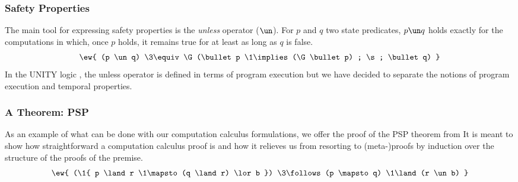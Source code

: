 \subsubsection{Safety Properties}
\label{sec:safety-properties}
The main tool for expressing safety properties is the \emph{unless} operator ($\un$).  For $p$ and $q$ two state predicates, $p \un q$ holds exactly for the computations in which, once $p$ holds, it remains true for at least as long as $q$ is false.
%
\begin{equation}
	\ew{ (p \un q) \3\equiv \G (\bullet p \1\implies (\G \bullet p) ; \s ; \bullet q) }
\end{equation}
%
In the UNITY logic \cite{DBLP:books/daglib/0067338}, the unless operator is defined in terms of program execution but we have decided to separate the notions of program execution and temporal properties. 


\subsubsection{A Theorem: PSP}
As an example of what can be done with our computation calculus formulations, we offer the proof of the PSP theorem from \cite{DBLP:books/daglib/0067338} It is meant to show how straightforward a computation calculus proof is and how it relieves us from resorting to (meta-)proofs by induction over the structure of the proofs of the premise.
%
\begin{equation}
	\ew{ (\1{ p \land r \1\mapsto (q \land r) \lor b })  \3\follows  (p \mapsto q) \1\land (r \un b)  }
		\label{sem:prog:thm:psp}
\end{equation}

